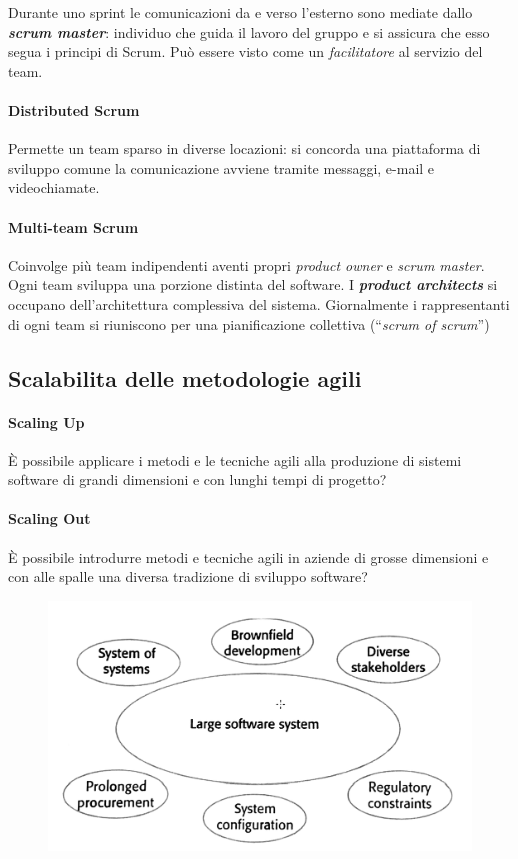 Durante uno sprint le comunicazioni da e verso l'esterno sono mediate dallo \textbf{\textit{scrum master}}: individuo che guida il lavoro del gruppo e si assicura che esso segua i principi di Scrum. Può essere visto come un \textit{facilitatore} al servizio del team.

\paragraph{Distributed Scrum} Permette un team sparso in diverse locazioni: si concorda una piattaforma di sviluppo comune la comunicazione avviene tramite messaggi, e-mail e videochiamate.

\paragraph{Multi-team Scrum} Coinvolge più team indipendenti aventi propri \textit{product owner} e \textit{scrum master}. Ogni team sviluppa una porzione distinta del software. I \textbf{\textit{product architects}} si occupano dell'architettura complessiva del sistema. Giornalmente i rappresentanti di ogni team si riuniscono per una pianificazione collettiva (“\textit{scrum of scrum}”)

\subsection{Scalabilita delle metodologie agili}

\paragraph{Scaling Up} È possibile applicare i metodi e le tecniche agili alla produzione di sistemi software di grandi dimensioni e con lunghi tempi di progetto?

\paragraph{Scaling Out} È possibile introdurre metodi e tecniche agili in aziende di grosse dimensioni e con alle spalle una diversa tradizione di sviluppo software?

\begin{figure}[H]
    \centering
    \includegraphics[width=0.75\linewidth]{assets/large-software.png}
    \label{fig:large-software}
\end{figure}


